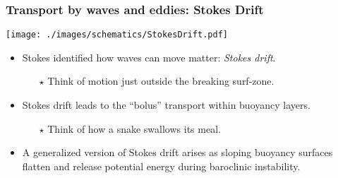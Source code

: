\documentclass[10pt]{beamer}
\begin{document}
\begin{frame}
  \frametitle{Transport by waves and eddies: Stokes Drift}

\begin{center}
\vspace{-.25cm}
{\texttt{[image: ./images/schematics/StokesDrift.pdf]}}
\vspace{-.5cm}
\end{center}

\begin{exampleblock}{}
\begin{itemize}
\item Stokes identified how waves can move matter: {\it Stokes drift}.
    \begin{itemize}
         \item[$\star$] Think of motion just outside the breaking surf-zone.  
    \end{itemize}

  \item Stokes drift leads to the ``bolus'' transport within buoyancy
    layers.
    \begin{itemize}
    \item[$\star$] Think of how a snake swallows its meal.
    \end{itemize}

  \item A generalized version of Stokes drift arises as sloping
    buoyancy surfaces flatten and release potential energy during
    baroclinic instability.


\end{itemize}
\end{exampleblock}{}

\end{frame}
\end{document}

